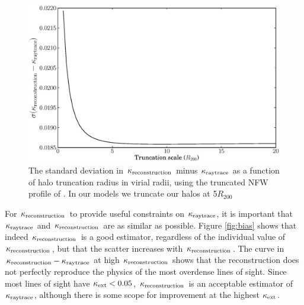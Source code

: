 \documentclass[useAMS,usenatbib]{mn2e}
\begin{document}
\begin{figure}
\includegraphics[width=\columnwidth]{truncation_scatter.eps}
\caption[magcut]{The standard deviation in $\kappa_{\rm reconstruction}$ minus $\kappa_{\rm raytrace}$ as a function of halo truncation radius in virial radii, using the truncated NFW profile of \citet{BMO}. In our models we truncate our halos at 5$R_{200}$}
\label{fig:ScattervsTruncation}
\end{figure}

For $\kappa_{\rm reconstruction}$ to provide useful constraints on $\kappa_{\rm raytrace}$, it is important that $\kappa_{\rm raytrace}$ and $\kappa_{\rm reconstruction}$ are as similar as possible. Figure \ref{fig:bias} shows that indeed $\kappa_{\rm reconstruction}$ is a good estimator, regardless of the individual value of $\kappa_{\rm reconstruction}$, but that the scatter increases with $\kappa_{\rm reconstruction}$. The curve in $\kappa_{\rm reconstruction}-\kappa_{\rm raytrace}$ at high $\kappa_{\rm reconstruction}$ shows that the reconstruction does not perfectly reproduce the physics of the most overdense lines of sight. Since most lines of sight have $\kappa_{\rm ext}<0.05$, $\kappa_{\rm reconstruction}$ is an acceptable estimator of $\kappa_{\rm raytrace}$, although there is some scope for improvement at the highest $\kappa_{\rm ext}$.
\end{document}
